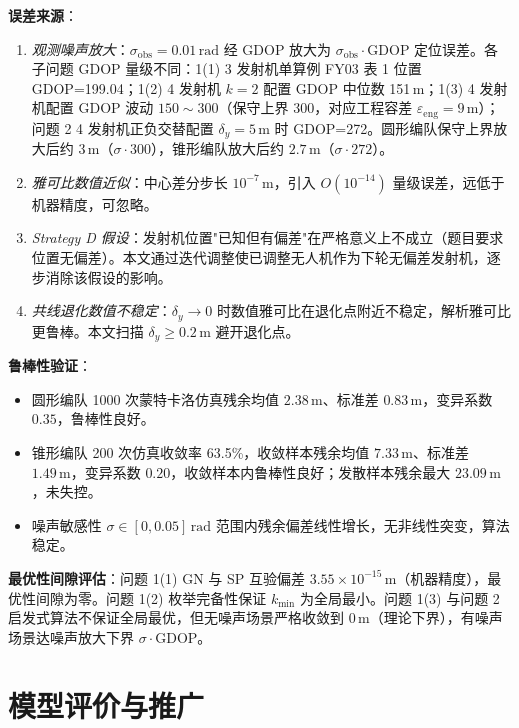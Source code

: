 \documentclass[12pt,a4paper]{ctexart}
\newcommand{\unit}[1]{\ensuremath{\,\mathrm{#1}}}
\begin{document}
\textbf{误差来源}：
\begin{enumerate}[label=(\arabic*), leftmargin=2em]
    \item \emph{观测噪声放大}：$\sigma_{\text{obs}}=0.01\unit{rad}$ 经 GDOP 放大为 $\sigma_{\text{obs}}\cdot\text{GDOP}$ 定位误差。各子问题 GDOP 量级不同：1(1) 3 发射机单算例 FY03 表 1 位置 GDOP=199.04；1(2) 4 发射机 $k=2$ 配置 GDOP 中位数 151\unit{m}；1(3) 4 发射机配置 GDOP 波动 $150\sim 300$（保守上界 300，对应工程容差 $\varepsilon_{\text{eng}}=9\unit{m}$）；问题 2 4 发射机正负交替配置 $\delta_y=5\unit{m}$ 时 GDOP=272。圆形编队保守上界放大后约 $3\unit{m}$（$\sigma\cdot 300$），锥形编队放大后约 $2.7\unit{m}$（$\sigma\cdot 272$）。
    \item \emph{雅可比数值近似}：中心差分步长 $10^{-7}\unit{m}$，引入 $O(10^{-14})$ 量级误差，远低于机器精度，可忽略。
    \item \emph{Strategy D 假设}：发射机位置"已知但有偏差"在严格意义上不成立（题目要求位置无偏差）。本文通过迭代调整使已调整无人机作为下轮无偏差发射机，逐步消除该假设的影响。
    \item \emph{共线退化数值不稳定}：$\delta_y\to 0$ 时数值雅可比在退化点附近不稳定，解析雅可比更鲁棒。本文扫描 $\delta_y\geq 0.2\unit{m}$ 避开退化点。
\end{enumerate}

\textbf{鲁棒性验证}：
\begin{itemize}
    \item 圆形编队 1000 次蒙特卡洛仿真残余均值 $2.38\unit{m}$、标准差 $0.83\unit{m}$，变异系数 $0.35$，鲁棒性良好。
    \item 锥形编队 200 次仿真收敛率 63.5\%，收敛样本残余均值 $7.33\unit{m}$、标准差 $1.49\unit{m}$，变异系数 $0.20$，收敛样本内鲁棒性良好；发散样本残余最大 $23.09\unit{m}$，未失控。
    \item 噪声敏感性 $\sigma\in[0,0.05]\unit{rad}$ 范围内残余偏差线性增长，无非线性突变，算法稳定。
\end{itemize}

\textbf{最优性间隙评估}：问题 1(1) GN 与 SP 互验偏差 $3.55\times 10^{-15}\unit{m}$（机器精度），最优性间隙为零。问题 1(2) 枚举完备性保证 $k_{\min}$ 为全局最小。问题 1(3) 与问题 2 启发式算法不保证全局最优，但无噪声场景严格收敛到 $0\unit{m}$（理论下界），有噪声场景达噪声放大下界 $\sigma\cdot\text{GDOP}$。

\section{模型评价与推广}
\end{document}
